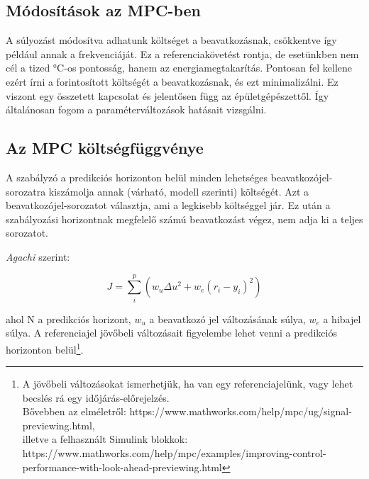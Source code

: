 \subsection{Módosítások az MPC-ben}

A súlyozást módosítva adhatunk költséget a beavatkozásnak, csökkentve így például annak a frekvenciáját. Ez a referenciakövetést rontja, de esetünkben nem cél a tized \si{\celsius}-os pontosság, hanem az energiamegtakarítás.
Pontosan fel kellene ezért írni a forintosított költségét a beavatkozásnak, és ezt minimalizálni. Ez viszont egy összetett kapcsolat és jelentősen függ az épületgépészettől. Így általánosan fogom a paraméterváltozások hatásait vizsgálni.

\subsection{Az MPC költségfüggvénye}


A szabályzó a predikciós horizonton belül minden lehetséges beavatkozójel-sorozatra kiszámolja annak (várható, modell szerinti) költségét. Azt a beavatkozójel-sorozatot választja, ami a legkisebb költséggel jár. Ez után a szabályozási horizontnak megfelelő számú beavatkozást végez, nem adja ki a teljes sorozatot. 

\textit{Agachi \cite{romanMPC_Agachi}} szerint:

\begin{equation} \label{eq_mpc_cost}
J = \sum_{i}^{p} \left(w_u \Delta u^2 + w_e (r_i-y_i)^2  \right)
\end{equation}

ahol N a predikciós horizont, $w_u$ a beavatkozó jel változásának súlya, $w_e$ a hibajel súlya. A referenciajel jövőbeli változásait figyelembe lehet venni a predikciós horizonton belül\footnote{A jövőbeli változásokat ismerhetjük, ha van egy referenciajelünk, vagy lehet becslés rá egy időjárás-előrejelzés.\\Bővebben az elméletről: https://www.mathworks.com/help/mpc/ug/signal-previewing.html,\\illetve a felhasznált Simulink blokkok: https://www.mathworks.com/help/mpc/examples/improving-control-performance-with-look-ahead-previewing.html}.

